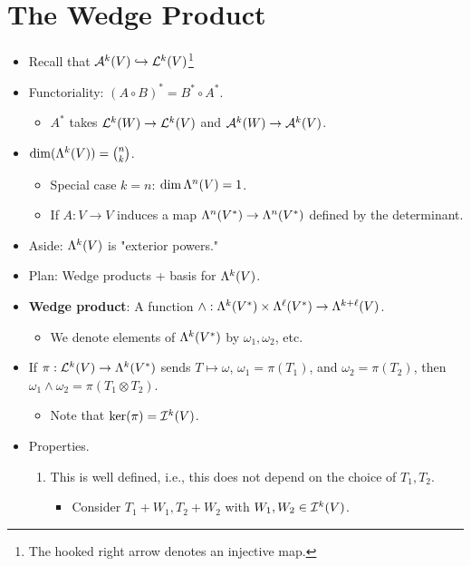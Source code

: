 \documentclass[../notes.tex]{subfiles}
\begin{document}
\section{The Wedge Product}
\begin{itemize}
    \item {}Recall that $\alt[k]{V}\hookrightarrow\lin[k]{V}$\footnote{The hooked right arrow denotes an injective map.}
    \item Functoriality: $(A\circ B)^*=B^*\circ A^*$.
    \begin{itemize}
        \item $A^*$ takes $\lin[k]{W}\to\lin[k]{V}$ and $\alt[k]{W}\to\alt[k]{V}$.
    \end{itemize}
    \item $\dim(\lam[k]{V})=\binom{n}{k}$.
    \begin{itemize}
        \item Special case $k=n$: $\dim\lam[n]{V}=1$.
        \item If $A:V\to V$ induces a map $\lam[n]{V^*}\to\lam[n]{V^*}$ defined by the determinant.
    \end{itemize}
    \item Aside: $\lam[k]{V}$ is "exterior powers."
    \item Plan: Wedge products + basis for $\lam[k]{V}$.
    \item \textbf{Wedge product}: A function $\wedge:\lam[k]{V^*}\times\lam[\ell]{V^*}\to\lam[k+\ell]{V}$. 
    \begin{itemize}
        \item We denote elements of $\lam[k]{V^*}$ by $\omega_1,\omega_2$, etc.
    \end{itemize}
    \item If $\pi:\lin[k]{V}\to\lam[k]{V^*}$ sends $T\mapsto\omega$, $\omega_1=\pi(T_1)$, and $\omega_2=\pi(T_2)$, then $\omega_1\wedge\omega_2=\pi(T_1\otimes T_2)$.
    \begin{itemize}
        \item Note that $\ker(\pi)=\ide[k]{V}$.
    \end{itemize}
    \item Properties.
    \begin{enumerate}
        \item This is well defined, i.e., this does not depend on the choice of $T_1,T_2$.
        \begin{itemize}
            \item Consider $T_1+W_1,T_2+W_2$ with $W_1,W_2\in\ide[k]{V}$.

\end{itemize}
\end{enumerate}
\end{itemize}
\end{document}
